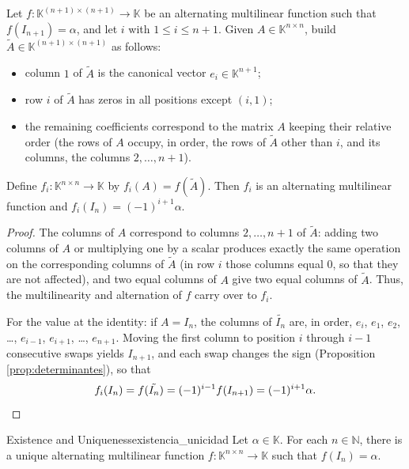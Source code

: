 \documentclass[11pt, a4paper]{article}
\begin{document}
\begin{lema}\label{lem:insercion}
Let $f: \mathbb{K}^{(n+1) \times (n+1)} \to \mathbb{K}$ be an alternating multilinear function such that $f(I_{n+1}) = \alpha$, and let $i$ with $1 \le i \le n+1$. Given $A \in \mathbb{K}^{n \times n}$, build $\tilde{A} \in \mathbb{K}^{(n+1) \times (n+1)}$ as follows:
\begin{itemize}
    \item column $1$ of $\tilde{A}$ is the canonical vector $e_i \in \mathbb{K}^{n+1}$;
    \item row $i$ of $\tilde{A}$ has zeros in all positions except $(i,1)$;
    \item the remaining coefficients correspond to the matrix $A$ keeping their relative order (the rows of $A$ occupy, in order, the rows of $\tilde{A}$ other than $i$, and its columns, the columns $2, \dots, n+1$).
\end{itemize}
Define $f_i: \mathbb{K}^{n \times n} \to \mathbb{K}$ by $f_i(A) = f(\tilde{A})$.
Then $f_i$ is an alternating multilinear function and $f_i(I_n) = (-1)^{i+1} \alpha$.
\end{lema}

\begin{proof}
The columns of $A$ correspond to columns $2, \dots, n+1$ of $\tilde{A}$: adding two columns of $A$ or multiplying one by a scalar produces exactly the same operation on the corresponding columns of $\tilde{A}$ (in row $i$ those columns equal $0$, so that they are not affected), and two equal columns of $A$ give two equal columns of $\tilde{A}$. Thus, the multilinearity and alternation of $f$ carry over to $f_i$.

For the value at the identity: if $A = I_n$, the columns of $\tilde{I_n}$ are, in order, $e_i$, $e_1$, $e_2$, \dots, $e_{i-1}$, $e_{i+1}$, \dots, $e_{n+1}$. Moving the first column to position $i$ through $i-1$ consecutive swaps yields $I_{n+1}$, and each swap changes the sign (Proposition \ref{prop:determinantes}), so that
\[
f_i(I_n) = f(\tilde{I_n}) = (-1)^{i-1} f(I_{n+1}) = (-1)^{i+1} \alpha. \qedhere
\]
\end{proof}

\begin{teorema}{Existence and Uniqueness}{existencia_unicidad}
Let $\alpha \in \mathbb{K}$. For each $n \in \mathbb{N}$, there is a unique alternating multilinear function $f: \mathbb{K}^{n \times n} \to \mathbb{K}$ such that $f(I_n) = \alpha$.
\end{teorema}
\end{document}
